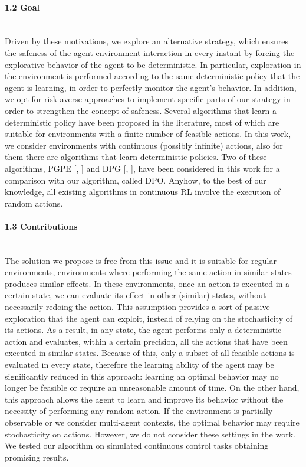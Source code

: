\paragraph{1.2 Goal} \mbox{} \\
\newline
Driven by these motivations, we explore an alternative strategy, which ensures the safeness of the agent-environment interaction in every instant by forcing the explorative behavior of the agent to be deterministic. In particular, exploration in the environment is performed according to the same deterministic policy that the agent is learning, in order to perfectly monitor the agent's behavior. In addition, we opt for risk-averse approaches to implement specific parts of our strategy in order to strengthen the concept of safeness. Several algorithms that learn a deterministic policy have been proposed in the literature, most of which are suitable for environments with a finite number of feasible actions. In this work, we consider environments with continuous (possibly infinite) actions, also for them there are algorithms that learn deterministic policies. Two of these algorithms, \acf{PGPE} [\citet{sehnke2008PolicyGradient}, ] and \acf{DPG} [\citet{article}, ], have been considered in this work for a comparison with our algorithm, called \acf{DPO}. Anyhow, to the best of our knowledge, all existing algorithms in continuous \ac{RL} involve the execution of random actions.
\paragraph{1.3 Contributions} \mbox{} \\
\newline
The solution we propose is free from this issue and it is suitable for regular environments, \ie environments where performing the same action in similar states produces similar effects. In these environments, once an action is executed in a certain state, we can evaluate its effect in other (similar) states, without necessarily redoing the action. This assumption provides a sort of passive exploration that the agent can exploit, instead of relying on the stochasticity of its actions. As a result, in any state, the agent performs only a deterministic action and evaluates, within a certain precision, all the actions that have been executed in similar states. Because of this, only a subset of all feasible actions is evaluated in every state, therefore the learning ability of the agent may be significantly reduced in this approach: learning an optimal behavior may no longer be feasible or require an unreasonable amount of time. On the other hand, this approach allows the agent to learn and improve its behavior without the necessity of performing any random action. If the environment is partially observable or we consider multi-agent contexts, the optimal behavior may require stochasticity on actions. However, we do not consider these settings in the work. We tested our algorithm on simulated continuous control tasks obtaining promising results.
